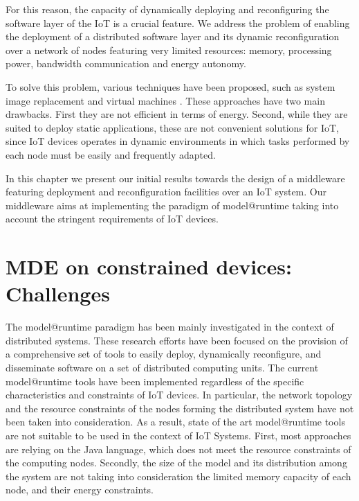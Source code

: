 For this reason, the capacity of dynamically deploying and reconfiguring the software layer of the IoT is a crucial feature.
We address the problem of enabling the deployment of a distributed software layer and its dynamic reconfiguration over a network of nodes featuring very limited resources: memory, processing power, bandwidth communication and energy autonomy. 

To solve this problem, various techniques have been proposed, such as system image replacement \cite{hui2004dynamic} and virtual machines \cite{koshy2005vmstar}. 
These approaches have two main drawbacks. 
First they are not efficient in terms of energy. 
Second, while they are suited to deploy static applications, these are not convenient solutions for IoT, since IoT devices operates in dynamic environments in which tasks performed by each node must be easily and frequently adapted.

In this chapter we present our initial results towards the design of a middleware featuring deployment and reconfiguration facilities over an IoT system. 
Our middleware aims at implementing the paradigm of model@runtime taking into account the stringent requirements of IoT devices.


\section{MDE on constrained devices: Challenges}
The model@runtime paradigm has been mainly investigated in the context of distributed systems. 
These research efforts have been focused on the provision of a comprehensive set of tools to easily deploy, dynamically reconfigure, and disseminate software on a set of distributed computing units.
The current model@runtime tools have been implemented regardless of the specific characteristics and constraints of IoT devices.
In particular, the network topology and the resource constraints of the nodes forming the distributed system have not been taken into consideration.
As a result, state of the art model@runtime tools are not suitable to be used in the context of IoT Systems.
First, most approaches are relying on the Java language, which does not meet the resource constraints of the computing nodes. 
Secondly, the size of the model and its distribution among the system are not taking into consideration the limited memory capacity of each node, and their energy constraints.


